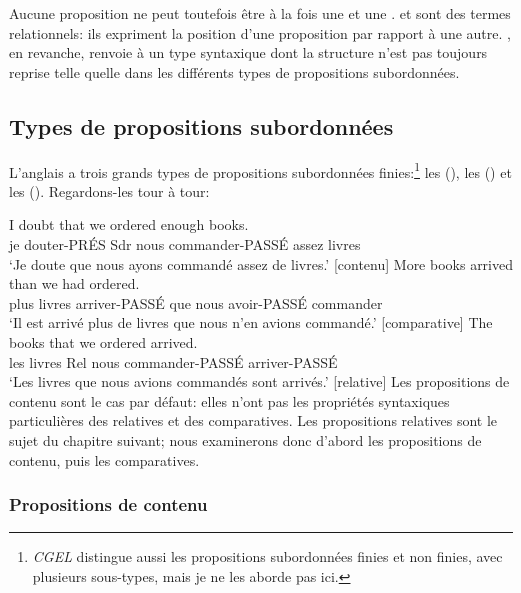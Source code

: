 Aucune proposition ne peut toutefois être à la fois une  et une .  et  sont des termes relationnels: ils expriment la position d'une proposition par rapport à une autre. , en revanche, renvoie à un type syntaxique dont la structure n'est pas toujours reprise telle quelle dans les différents types de propositions subordonnées.

\subsection{Types de propositions subordonnées}

L'anglais a trois grands types de propositions subordonnées finies:\footnote{\textit{CGEL} distingue aussi les propositions subordonnées finies et non finies, avec plusieurs sous-types, mais je ne les aborde pas ici.} les  (), les  () et les  (). Regardons-les tour à tour:

\ea \label{ex:sub-types-fr}
    \ea \gll I doubt that we ordered enough books.\\
        je douter-PRÉS Sdr nous commander-PASSÉ assez livres\\
    \glt `Je doute que nous ayons commandé assez de livres.' [contenu]
    \ex \gll More books arrived than we had ordered.\\
        plus livres arriver-PASSÉ que nous avoir-PASSÉ commander\\
    \glt `Il est arrivé plus de livres que nous n'en avions commandé.' [comparative]
    \ex \gll The books that we ordered arrived.\\
        les livres Rel nous commander-PASSÉ arriver-PASSÉ\\
    \glt `Les livres que nous avions commandés sont arrivés.' [relative]
    \z
\z
Les propositions de contenu sont le cas par défaut: elles n'ont pas les propriétés syntaxiques particulières des relatives et des comparatives. Les propositions relatives sont le sujet du chapitre suivant; nous examinerons donc d'abord les propositions de contenu, puis les comparatives.

\subsubsection{Propositions de contenu}

